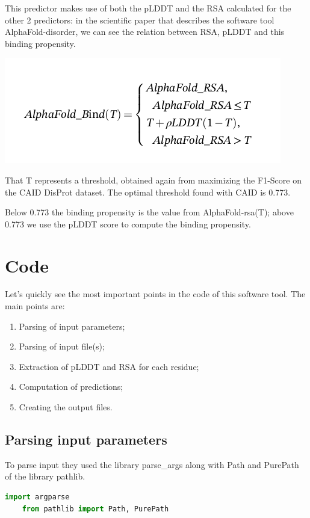 This predictor makes use of both the pLDDT and the RSA calculated for the other 2 predictors: in the scientific paper \cite{alphafold-disorder} that describes the software tool AlphaFold-disorder, we can see the relation between RSA, pLDDT and this binding propensity.

\includegraphics[scale=.7]{res/alphafold-binding.png}

That T represents a threshold, obtained again from maximizing the F1-Score on the CAID DisProt dataset. The optimal threshold found with CAID is 0.773. 

Below 0.773 the binding propensity is the value from AlphaFold-rsa(T); above 0.773 we use the pLDDT score to compute the binding propensity.

\section{Code}
Let's quickly see the most important points in the code of this software tool. The main points are: 
\begin{enumerate}

    \item Parsing of input parameters;
    \item Parsing of input file(s);
    \item Extraction of pLDDT and RSA for each residue;
    \item Computation of predictions;
    \item Creating the output files.
\end{enumerate}

\pagebreak

\subsection{Parsing input parameters}
To parse input they used the library parse\_args along with Path and PurePath of the library pathlib.

\begin{lstlisting}[language=Python, caption=import\ libraries\ parsing]
    import argparse
    from pathlib import Path, PurePath
\end{lstlisting}


